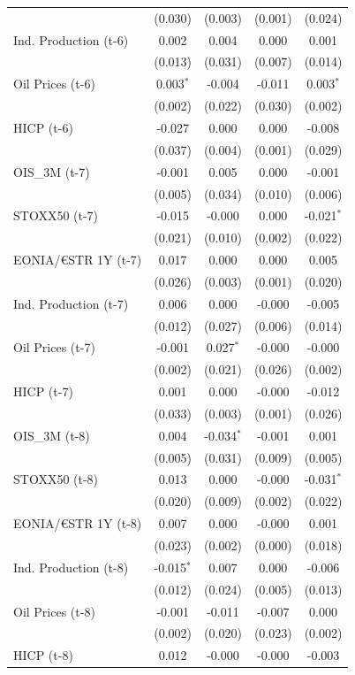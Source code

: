 \begin{longtable}[t]{lcccc}
 & (0.030) & (0.003) & (0.001) & (0.024)\\
Ind. Production (t-6) & 0.002 & 0.004 & 0.000 & 0.001\\
 & (0.013) & (0.031) & (0.007) & (0.014)\\
Oil Prices (t-6) & 0.003$^{*}$ & -0.004 & -0.011 & 0.003$^{*}$\\
 & (0.002) & (0.022) & (0.030) & (0.002)\\
HICP (t-6) & -0.027 & 0.000 & 0.000 & -0.008\\
 & (0.037) & (0.004) & (0.001) & (0.029)\\
OIS\_3M (t-7) & -0.001 & 0.005 & 0.000 & -0.001\\
 & (0.005) & (0.034) & (0.010) & (0.006)\\
STOXX50 (t-7) & -0.015 & -0.000 & 0.000 & -0.021$^{*}$\\
 & (0.021) & (0.010) & (0.002) & (0.022)\\
EONIA/€STR 1Y (t-7) & 0.017 & 0.000 & 0.000 & 0.005\\
 & (0.026) & (0.003) & (0.001) & \vphantom{1} (0.020)\\
Ind. Production (t-7) & 0.006 & 0.000 & -0.000 & -0.005\\
 & (0.012) & (0.027) & (0.006) & (0.014)\\
Oil Prices (t-7) & -0.001 & 0.027$^{*}$ & -0.000 & -0.000\\
 & (0.002) & (0.021) & (0.026) & (0.002)\\
HICP (t-7) & 0.001 & 0.000 & -0.000 & -0.012\\
 & (0.033) & (0.003) & (0.001) & (0.026)\\
OIS\_3M (t-8) & 0.004 & -0.034$^{*}$ & -0.001 & 0.001\\
 & (0.005) & (0.031) & (0.009) & (0.005)\\
STOXX50 (t-8) & 0.013 & 0.000 & -0.000 & -0.031$^{*}$\\
 & (0.020) & (0.009) & (0.002) & (0.022)\\
EONIA/€STR 1Y (t-8) & 0.007 & 0.000 & -0.000 & 0.001\\
 & (0.023) & (0.002) & (0.000) & (0.018)\\
Ind. Production (t-8) & -0.015$^{*}$ & 0.007 & 0.000 & -0.006\\
 & (0.012) & (0.024) & (0.005) & (0.013)\\
Oil Prices (t-8) & -0.001 & -0.011 & -0.007 & 0.000\\
 & (0.002) & (0.020) & (0.023) & (0.002)\\
HICP (t-8) & 0.012 & -0.000 & -0.000 & -0.003\\

\end{longtable}
